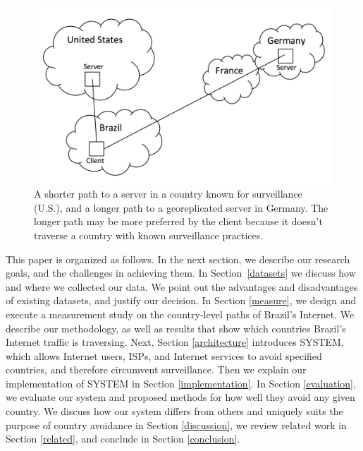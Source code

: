 \begin{figure}
\centering
\includegraphics[width=.5\textwidth]{intro_fig}
\caption{A shorter path to a server in a country known for surveillance (U.S.), and a longer path to a georeplicated server in Germany.  The longer path may be more preferred by the client because it doesn't traverse a country with known surveillance practices.}
\label{fig:intro}
\end{figure}

This paper is organized as follows.  In the next section, we describe our research goals, and the challenges in achieving them.  In Section~\ref{datasets} we discuss how and where we collected our data.  We point out the advantages and disadvantages of existing datasets, and justify our decision.  In Section \ref{measure}, we design and execute a measurement study on the country-level paths of Brazil's Internet.  We describe our methodology, as well as results that show which countries Brazil's Internet traffic is traversing.  Next, Section \ref{architecture} introduces SYSTEM, which allows Internet users, ISPs, and Internet services to avoid specified countries, and therefore circumvent surveillance.  Then we explain our implementation of SYSTEM in Section \ref{implementation}.  In Section \ref{evaluation}, we evaluate our system and proposed methods for how well they avoid any given country.  We discuss how our system differs from others and uniquely suits the purpose of country avoidance in Section \ref{discussion}, we review related work in Section \ref{related}, and conclude in Section \ref{conclusion}.
